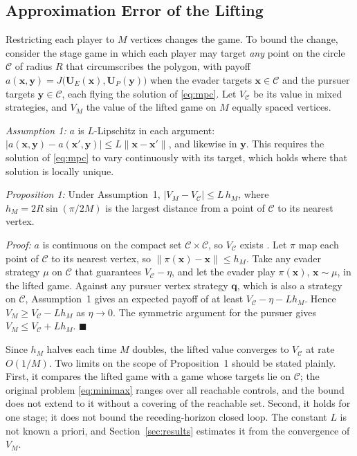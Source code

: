 \documentclass[letterpaper, 10 pt, conference]{ieeeconf}  %
\begin{document}

\subsection{Approximation Error of the Lifting}
\label{sec:lifting}

Restricting each player to $M$ vertices changes the game. To bound the change, consider the stage game in which each player may target \emph{any} point on the circle $\mathcal{C}$ of radius $R$ that circumscribes the polygon, with payoff $a(\mathbf{x}, \mathbf{y}) = J\big(\mathbf{U}_E(\mathbf{x}), \mathbf{U}_P(\mathbf{y})\big)$ when the evader targets $\mathbf{x} \in \mathcal{C}$ and the pursuer targets $\mathbf{y} \in \mathcal{C}$, each flying the solution of \eqref{eq:mpc}. Let $V_{\mathcal{C}}$ be its value in mixed strategies, and $V_M$ the value of the lifted game on $M$ equally spaced vertices.

\textit{Assumption 1:} $a$ is $L$-Lipschitz in each argument: $|a(\mathbf{x}, \mathbf{y}) - a(\mathbf{x}', \mathbf{y})| \leq L\|\mathbf{x} - \mathbf{x}'\|$, and likewise in $\mathbf{y}$. This requires the solution of \eqref{eq:mpc} to vary continuously with its target, which holds where that solution is locally unique.

\textit{Proposition 1:} Under Assumption~1, $|V_M - V_{\mathcal{C}}| \leq L\,h_M$, where $h_M = 2R\sin(\pi/2M)$ is the largest distance from a point of $\mathcal{C}$ to its nearest vertex.

\textit{Proof:} $a$ is continuous on the compact set $\mathcal{C} \times \mathcal{C}$, so $V_{\mathcal{C}}$ exists \cite{bacsar1998dynamic}. Let $\pi$ map each point of $\mathcal{C}$ to its nearest vertex, so $\|\pi(\mathbf{x}) - \mathbf{x}\| \leq h_M$. Take any evader strategy $\mu$ on $\mathcal{C}$ that guarantees $V_{\mathcal{C}} - \eta$, and let the evader play $\pi(\mathbf{x})$, $\mathbf{x} \sim \mu$, in the lifted game. Against any pursuer vertex strategy $\mathbf{q}$, which is also a strategy on $\mathcal{C}$, Assumption~1 gives an expected payoff of at least $V_{\mathcal{C}} - \eta - L h_M$. Hence $V_M \geq V_{\mathcal{C}} - L h_M$ as $\eta \to 0$. The symmetric argument for the pursuer gives $V_M \leq V_{\mathcal{C}} + L h_M$. \hfill $\blacksquare$

Since $h_M$ halves each time $M$ doubles, the lifted value converges to $V_{\mathcal{C}}$ at rate $O(1/M)$. Two limits on the scope of Proposition~1 should be stated plainly. First, it compares the lifted game with a game whose targets lie on $\mathcal{C}$; the original problem \eqref{eq:minimax} ranges over all reachable controls, and the bound does not extend to it without a covering of the reachable set. Second, it holds for one stage; it does not bound the receding-horizon closed loop. The constant $L$ is not known a priori, and Section~\ref{sec:results} estimates it from the convergence of $V_M$.
\end{document}
